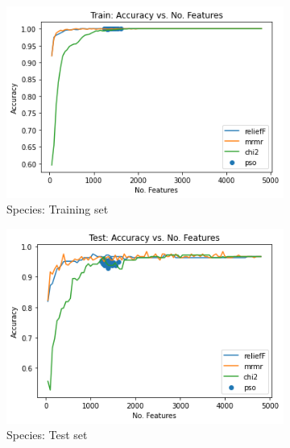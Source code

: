 \documentclass[runningheads]{llncs}
\begin{document}
\begin{figure}[htb]
  \centering
  \begin{subfigure}[b]{.45\linewidth}
    \includegraphics[width=\linewidth]{accuracy-features-fish-train.png}
    \caption{Species: Training set}\label{fig:accuracy-features-fish-train}
  \end{subfigure}
  \begin{subfigure}[b]{.45\linewidth}
    \includegraphics[width=\linewidth]{accuracy-features-fish-test.png}
    \caption{Species: Test set}\label{fig:accuracy-features-fish-test}
  \end{subfigure}
  \begin{subfigure}[b]{.45\linewidth}

\end{subfigure}
\end{figure}
\end{document}
